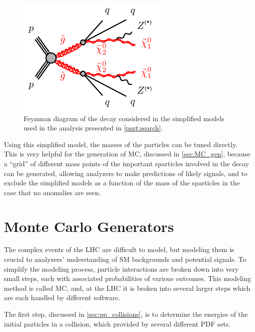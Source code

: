 \begin{centering}
\begin{figure}[!hbt]
\myfloatalign
\includegraphics[width=.9\linewidth]{figures/theory/gogo-qqqqZZN1N1.pdf}
\caption{Feynman diagram of the decay considered in the simplified models used in the analysis presented in \autoref{part:search}.}
\label{fig:simpmodel}
\end{figure}
\end{centering}

Using this simplified model, the masses of the particles can be tuned directly. This is very helpful for the generation of \ac{MC}, discussed in \autoref{sec:MC_gen}, because a ``grid'' of different mass points of the important sparticles involved in the decay can be generated, allowing analyzers to make predictions of likely signals, and to exclude the simplified models as a function of the mass of the sparticles in the case that no anomalies are seen. 

\section{Monte Carlo Generators}
\label{sec:MC_gen}

The complex events of the \ac{LHC} are difficult to model, but modeling them is crucial to analyzers' understanding of \ac{SM} backgrounds and potential signals. To simplify the modeling process, particle interactions are broken down into very small steps, each with associated probabilities of various outcomes. This modeling method is called \acf{MC}, and, at the \ac{LHC} it is broken into several larger steps which are each handled by different software. 

The first step, discussed in \autoref{sec:pp_collisions}, is to determine the energies of the initial particles in a collision, which provided by several different \ac{PDF} sets. 


